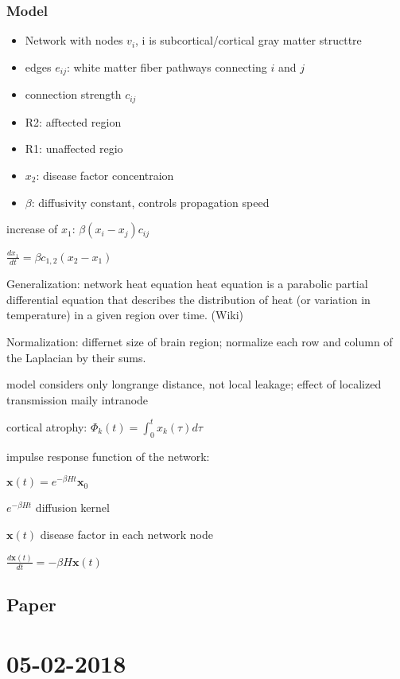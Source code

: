 \documentclass[fleqn]{article}\usepackage{caption}
\begin{document}
\subsubsection{Model}
\begin{itemize}
\item Network with nodes $v_i$, i is subcortical/cortical gray matter structtre
\item edges $e_{ij}$: white matter fiber pathways connecting $i$ and $j$
\item connection strength $c_{ij}$
\item R2: afftected region 
\item R1: unaffected regio
\item $x_2$: disease factor concentraion
\item $\beta$: diffusivity constant, controls propagation speed
\end{itemize}

increase of $x_1$: $\beta (x_i-x_j) c_{ij}$

$\frac{dx_1}{dt} = \beta c_{1,2} (x_2-x_1)$

Generalization: network heat equation
heat equation is a parabolic partial differential equation that describes the distribution of heat (or variation in temperature) in a given region over time. (Wiki)

Normalization: differnet size of brain region; normalize each row and column of the Laplacian by their sums.

model considers only longrange distance, not local leakage; effect of localized transmission maily intranode

cortical atrophy:
$\Phi_k(t) = \int_0^t x_k(\tau) d\tau $

impulse response function of the network:

$\textbf{x}(t) = e^{-\beta H t} \textbf{x}_0$
 
$e^{-\beta H t} $ diffusion kernel

$\textbf{x}(t)$ disease factor in each network node

$\frac{d\textbf{x}(t)}{dt} = -\beta H \textbf{x}(t)$


\subsection{Paper }



\section{05-02-2018}
\end{document}
